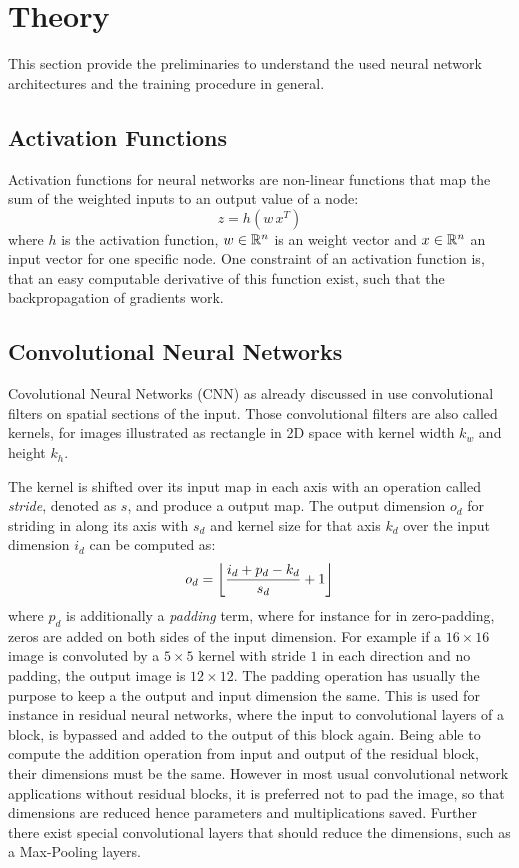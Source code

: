 
\section{Theory}\label{sec:nn_theory}
This section provide the preliminaries to understand the used neural network architectures and the training procedure in general.


\subsection{Activation Functions}\label{sec:nn_theory_acti}
Activation functions for neural networks are non-linear functions that map the sum of the weighted inputs to an output value of a node:
\begin{equation}\label{eq:nn_theory_acti}
  z = h(w \, x^T)
\end{equation}
where $h$ is the activation function, $w \in \R^n$ is an weight vector and $x \in \R^n$ an input vector for one specific node.
One constraint of an activation function is, that an easy computable derivative of this function exist, such that the backpropagation of gradients work.


\subsection{Convolutional Neural Networks}\label{sec:nn_theory_cnn}
Covolutional Neural Networks (CNN) as already discussed in  use convolutional filters on spatial sections of the input.
Those convolutional filters are also called kernels, for images illustrated as rectangle in 2D space with kernel width $k_w$ and height $k_h$.

The kernel is shifted over its input map in each axis with an operation called \emph{stride}, denoted as $s$, and produce a output map.
The output dimension $o_d$ for striding in along its axis with $s_d$ and kernel size for that axis $k_d$ over the input dimension $i_d$ can be computed as:
\begin{equation}\label{eq:nn_theory_cnn_}
  o_d = \floor*{\frac{i_d + p_d - k_d}{s_d} + 1}
\end{equation}
where $p_d$ is additionally a \emph{padding} term, where for instance for in zero-padding, zeros are added on both sides of the input dimension.
For example if a $16 \times 16$ image is convoluted by a $5 \times 5$ kernel with stride $1$ in each direction and no padding, the output image is $12 \times 12$.
The padding operation has usually the purpose to keep a the output and input dimension the same.
This is used for instance in residual neural networks, where the input to convolutional layers of a block, is bypassed and added to the output of this block again.
Being able to compute the addition operation from input and output of the residual block, their dimensions must be the same.
However in most usual convolutional network applications without residual blocks, it is preferred not to pad the image, so that dimensions are reduced hence parameters and multiplications saved.
Further there exist special convolutional layers that should reduce the dimensions, such as a Max-Pooling layers. 

